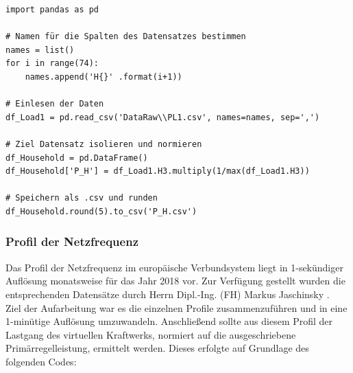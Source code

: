 \begin{code}
\label{code:household}
\begin{verbatim}
import pandas as pd

# Namen für die Spalten des Datensatzes bestimmen
names = list()
for i in range(74):
    names.append('H{}' .format(i+1))
    
# Einlesen der Daten
df_Load1 = pd.read_csv('DataRaw\\PL1.csv', names=names, sep=',')

# Ziel Datensatz isolieren und normieren
df_Household = pd.DataFrame()
df_Household['P_H'] = df_Load1.H3.multiply(1/max(df_Load1.H3))

# Speichern als .csv und runden
df_Household.round(5).to_csv('P_H.csv')
\end{verbatim}
\end{code}

\subsubsection{Profil der Netzfrequenz}

Das Profil der Netzfrequenz im europäische Verbundsystem liegt in 1-sekündiger Auflösung monatsweise für das Jahr 2018 vor. Zur Verfügung gestellt wurden die entsprechenden Datensätze durch Herrn Dipl.-Ing. (FH) Markus Jaschinsky \parencite{Jaschinsky18}.\medskip\\
Ziel der Aufarbeitung war es die einzelnen Profile zusammenzuführen und in eine 1-minütige Auflösung umzuwandeln. Anschließend sollte aus diesem Profil der Lastgang des virtuellen Kraftwerks, normiert auf die ausgeschriebene Primärregelleistung, ermittelt werden. Dieses erfolgte auf Grundlage des folgenden Codes:

